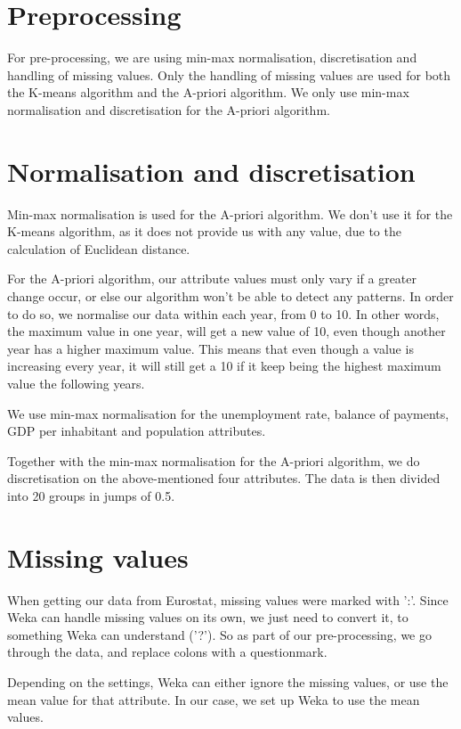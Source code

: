 \section{Preprocessing}
\label{PreP}For pre-processing, we are using min-max normalisation, discretisation and handling of missing values. Only the handling of missing values are used for both the K-means algorithm and the A-priori algorithm. We only use min-max normalisation and discretisation for the A-priori algorithm.

\section{Normalisation and discretisation}
Min-max normalisation is used for the A-priori algorithm. We don't use it for the K-means algorithm, as it does not provide us with any value, due to the calculation of Euclidean distance.

For the A-priori algorithm, our attribute values must only vary if a greater change occur, or else our algorithm won't be able to detect any patterns. In order to do so, we normalise our data within each year, from 0 to 10. In other words, the maximum value in one year, will get a new value of 10, even though another year has a higher maximum value. This means that even though a value is increasing every year, it will still get a 10 if it keep being the highest maximum value the following years.

We use min-max normalisation for the unemployment rate, balance of payments, GDP per inhabitant and population attributes.

Together with the min-max normalisation for the A-priori algorithm, we do discretisation on the above-mentioned four attributes. The data is then divided into 20 groups in jumps of 0.5.

\section{Missing values}
When getting our data from Eurostat, missing values were marked with ':'. Since Weka can handle missing values on its own, we just need to convert it, to something Weka can understand ('?'). So as part of our pre-processing, we go through the data, and replace colons with a questionmark.

Depending on the settings, Weka can either ignore the missing values, or use the mean value for that attribute. In our case, we set up Weka to use the mean values.